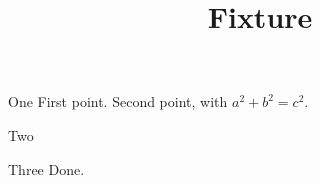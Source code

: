 \documentclass{beamer}
\title{Fixture}
\begin{document}
\begin{frame}
  \titlepage
\end{frame}
\begin{frame}{One}
  First point. \pause Second point, with $a^2+b^2=c^2$.
\end{frame}
\begin{frame}{Two}
\end{frame}
\begin{frame}{Three}
  Done.
\end{frame}
\end{document}
